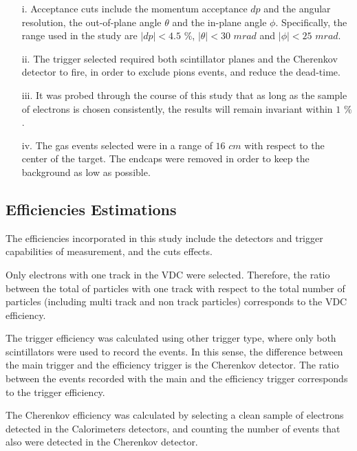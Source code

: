 \documentclass[final,5p,times,twocolumn,balance]{elsarticle}
\begin{document}
\begin{itemize}
\item[i.]Acceptance cuts include the momentum acceptance $dp$ and the angular resolution, the out-of-plane angle $\theta $ and the in-plane angle $\phi $. Specifically, the range used in the study 
are $|dp| < 4.5$ $\%$,  $|\theta| < 30 $ $mrad  $ and $|\phi| < 25$ $mrad$.

\item[ii.] The trigger selected required both scintillator planes and the Cherenkov detector to fire, in order to exclude pions events, and reduce the dead-time.

\item[iii.] It was  probed through the course of this study that as long as the sample of electrons is chosen consistently, the results will remain invariant within $1$ $\%$.

\item[iv.] The gas events selected were in a range of $16$ $cm$ with respect to the center of the target. The endcaps were removed in order to keep the background as low as possible.

\end{itemize}

\subsection{Efficiencies Estimations } 

The efficiencies incorporated in this study include the detectors and trigger capabilities of measurement, and the cuts effects. 

Only electrons with one track in the VDC were selected. Therefore, the ratio between the total of particles with one track with respect to the total number of particles (including multi track and non track particles) corresponds to the VDC efficiency.  

The trigger efficiency was calculated using other trigger type, where only both scintillators were used to record the events. In this sense, the difference between the main trigger and the efficiency trigger is the Cherenkov detector.  The ratio between the events recorded with the main and the efficiency trigger corresponds to the trigger efficiency.

The Cherenkov efficiency was calculated by selecting a clean sample of electrons detected in the Calorimeters detectors, and counting the number of events that also were detected in the Cherenkov detector.
\end{document}
